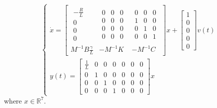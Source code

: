 \begin{equation}
\begin{cases}
\dot{x}=
\left[ \begin{array} { c|c|c  } 
                \begin{array}{c} 
               -\frac{R}{L} \\ 
                0 \\
                0 \\
                0
                \end{array} &
                \begin{array}{ccc} 
               0 & 0 & 0\\ 
                0 & 0  &0 \\
                0  & 0  & 0\\
                0 & 0 &0
                \end{array}&
                \begin{array}{ccc} 
               0 & 0 &0\\ 
                1 & 0 &0 \\
                0  & 1  &0 \\
                0 & 0 & 1
                \end{array} \\
                \hline 
                M^{-1}B\frac{\gamma} {L}& -M^{-1}K & -M^{-1}C
\end{array} \right] 
x+\begin{bmatrix}1 \\ 0 \\ 0 \\ 0 \\ 0\end{bmatrix}v(t)\\
y(t) = \begin{bmatrix} \frac{1}{L} & 0 & 0 & 0 & 0 & 0 &0\\
0 & 1 & 0 & 0 & 0 & 0 &0 \\
0 & 0 & 1 & 0 & 0 &0  &0 \\
0 & 0 & 0 & 1 & 0 & 0 &0 \end{bmatrix}x
\end{cases}
\end{equation}
where $x \in \mathbb{R}^7$.
